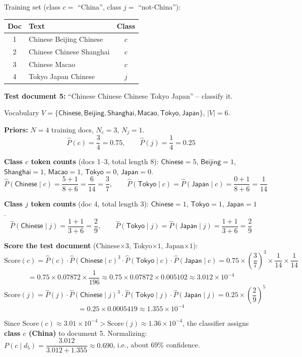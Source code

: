 \documentclass[11pt, a4paper]{article}
\begin{document}
\begin{examplebox}
Training set (class $c=$ ``China'', class $j=$ ``not-China''):

\begin{center}
\begin{tabular}{@{}clc@{}}
\toprule
Doc & Text & Class \\
\midrule
1 & Chinese Beijing Chinese & $c$ \\
2 & Chinese Chinese Shanghai & $c$ \\
3 & Chinese Macao & $c$ \\
4 & Tokyo Japan Chinese & $j$ \\
\bottomrule
\end{tabular}
\end{center}

\textbf{Test document 5:} ``Chinese Chinese Chinese Tokyo Japan'' -- classify it.

Vocabulary $V=\{\textsf{Chinese},\textsf{Beijing},\textsf{Shanghai},\textsf{Macao},\textsf{Tokyo},\textsf{Japan}\}$, $|V|=6$.

\textbf{Priors:} $N=4$ training docs, $N_c=3$, $N_j=1$.
\[
\hat P(c) = \frac34 = 0.75, \qquad \hat P(j) = \frac14 = 0.25
\]

\textbf{Class $c$ token counts} (docs 1--3, total length $8$): $\textsf{Chinese}=5$, $\textsf{Beijing}=1$, $\textsf{Shanghai}=1$, $\textsf{Macao}=1$, $\textsf{Tokyo}=0$, $\textsf{Japan}=0$.
\[
\hat P(\textsf{Chinese}\mid c) = \frac{5+1}{8+6} = \frac{6}{14} = \frac37, \qquad
\hat P(\textsf{Tokyo}\mid c) = \hat P(\textsf{Japan}\mid c) = \frac{0+1}{8+6}=\frac{1}{14}
\]

\textbf{Class $j$ token counts} (doc 4, total length $3$): $\textsf{Chinese}=1$, $\textsf{Tokyo}=1$, $\textsf{Japan}=1$.
\[
\hat P(\textsf{Chinese}\mid j) = \frac{1+1}{3+6}=\frac29, \qquad
\hat P(\textsf{Tokyo}\mid j) = \hat P(\textsf{Japan}\mid j) = \frac{1+1}{3+6}=\frac29
\]

\textbf{Score the test document} (Chinese$\times3$, Tokyo$\times1$, Japan$\times1$):
\[
\text{Score}(c) = \hat P(c)\cdot\hat P(\textsf{Chinese}\mid c)^3\cdot \hat P(\textsf{Tokyo}\mid c)\cdot\hat P(\textsf{Japan}\mid c) = 0.75\times\left(\frac37\right)^3\times\frac1{14}\times\frac1{14}
\]
\[
= 0.75\times0.07872\times\frac1{196} \approx 0.75\times0.07872\times0.005102 \approx 3.012\times10^{-4}
\]
\[
\text{Score}(j) = \hat P(j)\cdot\hat P(\textsf{Chinese}\mid j)^3\cdot \hat P(\textsf{Tokyo}\mid j)\cdot\hat P(\textsf{Japan}\mid j) = 0.25\times\left(\frac29\right)^5
\]
\[
= 0.25\times0.0005419 \approx 1.355\times10^{-4}
\]

Since $\text{Score}(c) \approx 3.01\times10^{-4} > \text{Score}(j)\approx1.36\times10^{-4}$, the classifier assigns \textbf{class $c$ (China)} to document 5. Normalizing: $P(c\mid d_5) = \dfrac{3.012}{3.012+1.355}\approx0.690$, i.e., about 69\% confidence.
\end{examplebox}
\end{document}
